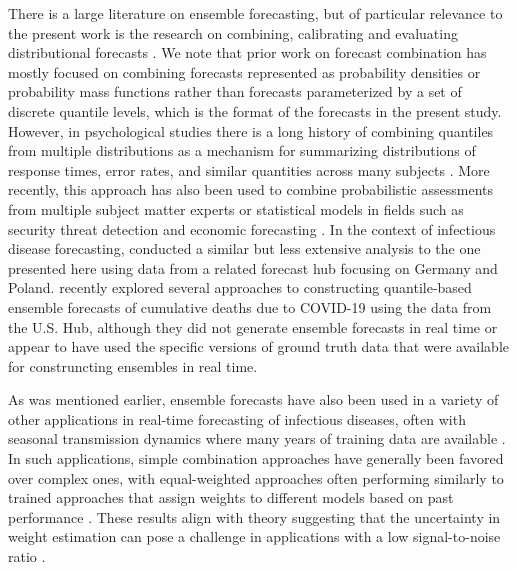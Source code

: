\documentclass[11pt,3p,review,authoryear]{elsarticle}
\begin{document}
There is a large literature on ensemble forecasting, but of particular relevance to the present work is the research on combining, calibrating and evaluating distributional forecasts \citep{gneiting_strictly_2007,gneiting_probabilistic_2007,ranjan_combining_2010,claeskens_forecast_2016}.
We note that prior work on forecast combination has mostly focused on combining forecasts represented as probability densities or probability mass functions rather than forecasts parameterized by a set of discrete quantile levels, which is the format of the forecasts in the present study.
However, in psychological studies there is a long history of combining quantiles from multiple distributions as a mechanism for summarizing distributions of response times, error rates, and similar quantities across many subjects \citep{vincent1912functionsOfVibrissae, ratcliff1979vincentization}.
More recently, this approach has also been used to combine probabilistic assessments from multiple subject matter experts or statistical models in fields such as security threat detection and economic forecasting \citep{hora2013medianAggregationDistribution, lichtendahl2013betterAveProbQuant, gaba2017combiningIntervalForecasts,
busetti2017quantileAggregationDensityForecasts}.
In the context of infectious disease forecasting, \cite{bracher_preregistered_covid_de_pl_2021} conducted a similar but less extensive analysis to the one presented here using data from a related forecast hub focusing on Germany and Poland. \cite{taylor2021combiningForecastsCOVID} recently explored several approaches to constructing quantile-based ensemble forecasts of cumulative deaths due to COVID-19 using the data from the U.S. Hub, although they did not generate ensemble forecasts in real time or appear to have used the specific versions of ground truth data that were available for construncting ensembles in real time.

As was mentioned earlier, ensemble forecasts have also been used in a variety of other applications in real-time forecasting of infectious diseases, often with seasonal transmission dynamics where many years of training data are available \citep{yamanaSuperensembleForecastsDengue2016,reich_accuracy_2019,reis_superensemble_2019,colon-gonzalez_probabilistic_2021}.
In such applications, simple combination approaches have generally been favored over complex ones, with equal-weighted approaches often performing similarly to trained approaches that assign weights to different models based on past performance \citep{ray_feature_weighted_ensembles, bracher_preregistered_covid_de_pl_2021}.
These results align with theory suggesting that the uncertainty in weight estimation can pose a challenge in applications with a low signal-to-noise ratio \citep{claeskens_forecast_2016}.
\end{document}
